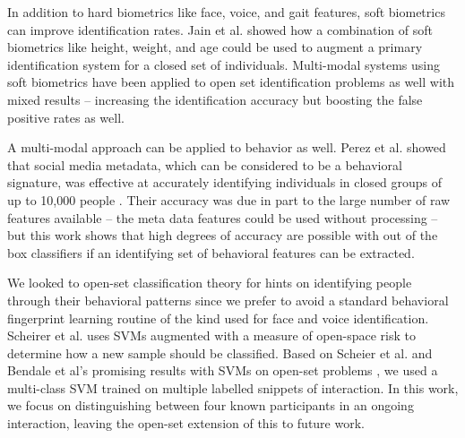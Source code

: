 \documentclass[conference]{IEEEtran}
\begin{document}
In addition to hard biometrics like face, voice, and gait features, soft biometrics can improve identification rates. Jain et al. \cite{jain2004soft} showed how a combination of soft biometrics like height, weight, and age could be used to augment a primary identification system for a closed set of individuals. Multi-modal systems using soft biometrics have been applied to open set identification problems as well with mixed results -- increasing the identification accuracy but boosting the false positive rates as well. \cite{irfan2018multi}\cite{martinson2013identifying}  

A multi-modal approach can be applied to behavior as well. Perez et al. showed that social media metadata, which can be considered to be a behavioral signature, was effective at accurately identifying individuals in closed groups of up to 10,000 people \cite{perez_you_2018}. Their accuracy was due in part to the large number of raw features available -- the meta data features could be used without processing -- but this work shows that high degrees of accuracy are possible with out of the box classifiers if an identifying set of behavioral features can be extracted. 

We looked to open-set classification theory for hints on identifying people through their behavioral patterns since we prefer to avoid a standard behavioral fingerprint learning routine of the kind used for face and voice identification. Scheirer et al. uses SVMs augmented with a measure of open-space risk to determine how a new sample should be classified\cite{scheirer_toward_2013}. Based on Scheier et al. and Bendale et al's promising results with SVMs on open-set problems \cite{bendale_towards_2015}\cite{scheirer_toward_2013}, we used a multi-class SVM trained on multiple labelled snippets of interaction. In this work, we focus on distinguishing between four known participants in an ongoing interaction, leaving the open-set extension of this to future work.
\end{document}
